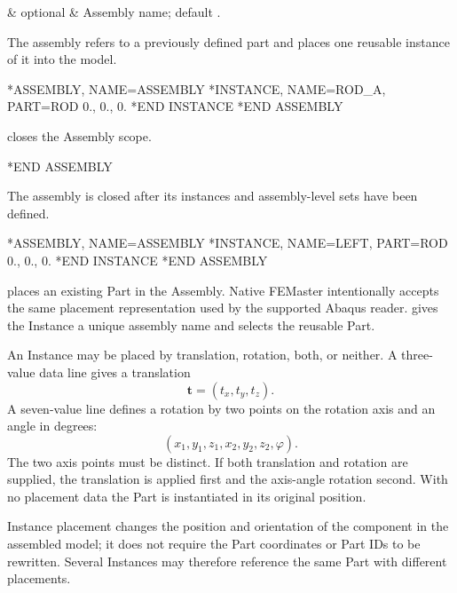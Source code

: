 \begin{keywordparameters}
 & optional & Assembly name; default . \\
\end{keywordparameters}

The assembly refers to a previously defined part and places one reusable instance of it into the model.

\exampleheading

\begin{inputdeck}
*ASSEMBLY, NAME=ASSEMBLY
*INSTANCE, NAME=ROD_A, PART=ROD
0., 0., 0.
*END INSTANCE
*END ASSEMBLY
\end{inputdeck}


 closes the Assembly scope.

\syntaxheading

\begin{syntax}
*END ASSEMBLY
\end{syntax}

The assembly is closed after its instances and assembly-level sets have been defined.

\exampleheading

\begin{inputdeck}
*ASSEMBLY, NAME=ASSEMBLY
*INSTANCE, NAME=LEFT, PART=ROD
0., 0., 0.
*END INSTANCE
*END ASSEMBLY
\end{inputdeck}



 places an existing Part in the Assembly. Native FEMaster intentionally accepts the same placement representation used by the supported Abaqus reader.  gives the Instance a unique assembly name and  selects the reusable Part.

An Instance may be placed by translation, rotation, both, or neither. A three-value data line gives a translation
\[
\boldsymbol t=(t_x,t_y,t_z).
\]
A seven-value line defines a rotation by two points on the rotation axis and an angle in degrees:
\[
(x_1,y_1,z_1,x_2,y_2,z_2,\varphi).
\]
The two axis points must be distinct. If both translation and rotation are supplied, the translation is applied first and the axis-angle rotation second. With no placement data the Part is instantiated in its original position.

Instance placement changes the position and orientation of the component in the assembled model; it does not require the Part coordinates or Part IDs to be rewritten. Several Instances may therefore reference the same Part with different placements.

